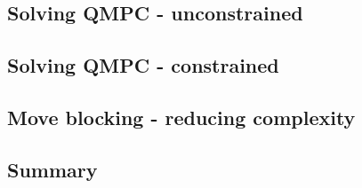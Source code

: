 \subsection{Solving QMPC - unconstrained}

\subsection{Solving QMPC - constrained}

\subsection{Move blocking - reducing complexity}

\subsection{Summary}
